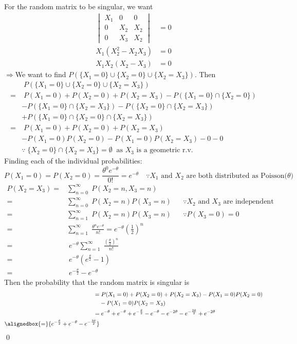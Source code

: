 \documentclass{mthe353answer}
\begin{document}
\begin{questions}
  \setcounter{question}{3}
  \question{}
  For the random matrix to be singular, we want
  \begin{align*}
    \begin{vmatrix}
      X_1 & 0 & 0\\
      0&X_2&X_2\\
      0&X_3&X_2
    \end{vmatrix} &= 0\\
    X_1(X_2^2-X_2X_3) &= 0\\
    X_1X_2(X_2-X_3) &= 0
  \end{align*}
  \(\Rightarrow\)We want to find \(P(\{X_1=0\}\cup\{X_2=0\}\cup\{X_2=X_3\})\). Then
  \begin{align*}
      &\; P(\{X_1=0\}\cup\{X_2=0\}\cup\{X_2=X_3\})\\
     =&\; P(X_1=0)+P(X_2=0)+P(X_2=X_3)-P(\{X_1=0\}\cap\{X_2=0\})\\
      &-P(\{X_1=0\}\cap\{X_2=X_3\})-P(\{X_2=0\}\cap\{X_2=X_3\})\\
      &+P(\{X_1=0\}\cap\{X_2=0\}\cap\{X_2=X_3\})\\
     =&\; P(X_1=0)+P(X_2=0)+P(X_2=X_3)\\
      &-P(X_1=0)P(X_2=0)-P(X_1=0)P(X_2=X_3)-0-0\\
      & \because\; \{X_2=0\}\cap\{X_2=X_3\}=\emptyset\ \text{ as \(X_3\) is a geometric r.v.}
  \end{align*}
  Finding each of the individual probabilities:
  \begin{displaymath}
    P(X_1=0)=P(X_2=0)=\frac{\theta^0e^{-\theta}}{0!}=e^{-\theta}\quad \because X_1 \text{ and } X_2 \text{ are both distributed as Poisson(\(\theta\))}
  \end{displaymath}
  \begin{align*}
    P(X_2=X_3) =& \sum_{n=0}^{\infty}\; P(X_2=n,X_3=n)\\
    =& \sum_{n=0}^{\infty}\; P(X_2=n)P(X_3=n) && \because X_2 \text{ and } X_3 \text{ are independent}\\
    =& \sum_{n=1}^{\infty}\; P(X_2=n)P(X_3=n) && \because P(X_3=0)=0\\
    =& \sum_{n=1}^{\infty}\; \frac{\theta^n{}e^{-\theta}}{n!}=e^{-\theta}\left(\frac{1}{2}\right)^n\\
    =&\; e^{-\theta} \sum_{n=1}^{\infty}\; \frac{\left(\frac{\theta}{2}\right)^n}{n!}\\
    =&\; e^{-\theta}\left(e^{\frac{\theta}{2}}-1\right)\\
    =&\; e^{-\frac{\theta}{2}}-e^{-\theta}
  \end{align*}
  Then the probability that the random matrix is singular is
  \begin{align*}
    =& \; P(X_1=0)+P(X_2=0)+P(X_2=X_3)-P(X_1=0)P(X_2=0)\\
     &-P(X_1=0)P(X_2=X_3)\\
    =& \; e^{-\theta}+e^{-\theta}+e^{-\frac{\theta}{2}}-e^{-\theta}-e^{-2\theta}-e^{-\frac{3\theta}{2}}+e^{-2\theta}\\
    \alignedbox{=}{e^{-\frac{\theta}{2}}+e^{-\theta}-e^{-\frac{3\theta}{2}}}
  \end{align*}
  \hfill\qed{}
\end{questions}
\end{document}
